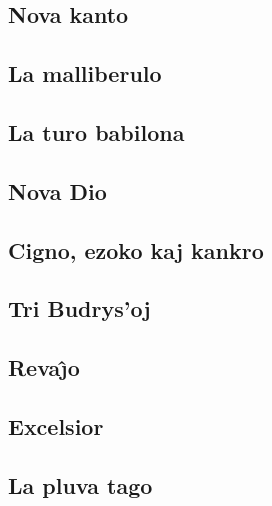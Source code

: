 \documentclass[a5paper,11pt,openany,twoside]{book}
\begin{document}
\subsection{Nova kanto}
\label{nova}


\subsection{La malliberulo}
\label{malliberulo}


\subsection{La turo babilona}
\label{turo}

\subsection{Nova Dio}
\label{novadio}


\newpage %

\subsection{Cigno, ezoko kaj kankro}
\label{cigno}


\newpage %

\subsection{Tri Budrys'oj}
\label{tri}


\vspace*{-5ex} %

\subsection{Reva\^{\j}o}
\label{revajxo}


\vspace*{-5ex} %

\subsection{Excelsior}
\label{excelsior}

\subsection{La pluva tago}
\label{pluva}

\end{document}
